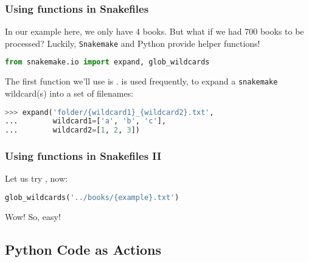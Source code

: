 \begin{frame}[fragile]
  \frametitle{Using functions in Snakefiles}
  In our example here, we only have 4 books. But what if we had 700 books to be processed? \newline
  Luckily, \texttt{Snakemake} and Python provide helper functions!
  \begin{lstlisting}[language=Python,style=Python]
from snakemake.io import expand, glob_wildcards
  \end{lstlisting}
  The first function we’ll use is .  is used frequently, to expand a \texttt{snakemake} wildcard(s) into a set of filenames:
  \begin{lstlisting}[language=Python,style=Python]
>>> expand('folder/{wildcard1}_{wildcard2}.txt',
...        wildcard1=['a', 'b', 'c'],
...        wildcard2=[1, 2, 3])
  \end{lstlisting}
\end{frame}

\begin{frame}[fragile]
  \frametitle{Using functions in Snakefiles II}
  \pause
  \pause
  Let us try , now:
  \begin{lstlisting}[language=Python,style=Python]
glob_wildcards('../books/{example}.txt')
  \end{lstlisting}
  \pause
  Wow! So, easy!
\end{frame}

\subsection{Python Code as Actions}

